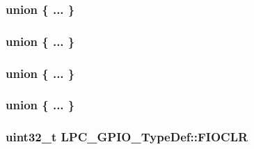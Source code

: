 \subsubsection[{\texorpdfstring{"@12}{@12}}]{\setlength{\rightskip}{0pt plus 5cm}union \{ ... \} }\hypertarget{structLPC__GPIO__TypeDef_a3d25c074b7753431a976ca9b7ca79304}{}\label{structLPC__GPIO__TypeDef_a3d25c074b7753431a976ca9b7ca79304}
\subsubsection[{\texorpdfstring{"@4}{@4}}]{\setlength{\rightskip}{0pt plus 5cm}union \{ ... \} }\hypertarget{structLPC__GPIO__TypeDef_a7cdbaed893595e48ccf290eacc3ed795}{}\label{structLPC__GPIO__TypeDef_a7cdbaed893595e48ccf290eacc3ed795}
\subsubsection[{\texorpdfstring{"@6}{@6}}]{\setlength{\rightskip}{0pt plus 5cm}union \{ ... \} }\hypertarget{structLPC__GPIO__TypeDef_ac306f5105abc07c4f59f74d7ab18ac8c}{}\label{structLPC__GPIO__TypeDef_ac306f5105abc07c4f59f74d7ab18ac8c}
\subsubsection[{\texorpdfstring{"@8}{@8}}]{\setlength{\rightskip}{0pt plus 5cm}union \{ ... \} }\hypertarget{structLPC__GPIO__TypeDef_a6cb1ebf27c29edec6083e2161d53078b}{}\label{structLPC__GPIO__TypeDef_a6cb1ebf27c29edec6083e2161d53078b}
\subsubsection[{\texorpdfstring{F\+I\+O\+C\+LR}{FIOCLR}}]{ uint32\+\_\+t L\+P\+C\+\_\+\+G\+P\+I\+O\+\_\+\+Type\+Def\+::\+F\+I\+O\+C\+LR}\hypertarget{structLPC__GPIO__TypeDef_adaa1ee82b7dfb7cbeaa41ca11cbb4a25}{}\label{structLPC__GPIO__TypeDef_adaa1ee82b7dfb7cbeaa41ca11cbb4a25}
